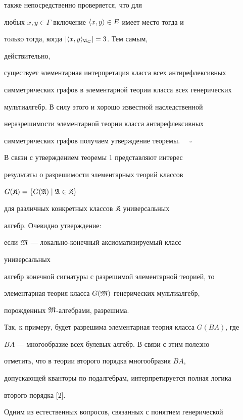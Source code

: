 также непосредственно проверяется, что для 


любых $x,y\in\Gamma$ включение $\langle x,y\rangle\in E$ имеет место тогда и 


только тогда, когда $|\langle x,y\rangle_{\frak A_G}|=3$. Тем самым, 


действительно, 


существует элементарная интерпретация класса всех антирефлексивных 


симметрических графов в элементарной теории класса всех генерических 


мультиалгебр. В силу этого и хорошо известной наследственной 


неразрешимости элементарной теории класса антирефлексивных 


симметрических графов получаем утверждение теоремы. $\quad\square$ 


 


В связи с утверждением теоремы 1 представляют интерес 


результаты о разрешимости элементарных теорий классов 


$G(\frak K)=\{G(\frak A)\mid\frak A\in\frak K\}$ 


для различных конкретных классов $\frak K$ универсальных 


алгебр. Очевидно утверждение: 


если $\frak M$ --- локально-конечный аксиоматизируемый класс 


универсальных 


алгебр конечной сигнатуры с разрешимой элементарной теорией, то 


элементарная теория класса $G(\frak M)$ генерических мультиалгебр, 


порожденных $\frak M$-алгебрами, разрешима. 


 


Так, к примеру, будет разрешима элементарная теория класса $G(BA)$, где 


$BA$ --- многообразие всех булевых алгебр. В связи с этим полезно 


отметить, что в теории второго порядка многообразия $BA$,


допускающей кванторы по подалгебрам, интерпретируется полная логика 


второго порядка [2]. 


 


Одним из естественных вопросов, связанных с понятием генерической 


